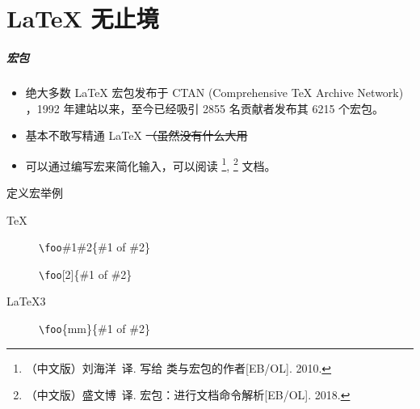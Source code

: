 
\part{\LaTeX{} 无止境}

\begin{frame}
  \frametitle{宏包}

  \begin{itemize}
    \item 绝大多数 \LaTeX{} 宏包发布于 CTAN (Comprehensive \TeX{} Archive Network) ，1992 年建站以来，至今已经吸引 2855 名贡献者发布其 6215 个宏包。 
    \item {}基本不敢写精通 \LaTeX{} \sout{（虽然没有什么大用}
    \item 可以通过编写宏来简化输入，可以阅读 \footnote{（中文版）刘海洋~译. 写给 \LaTeXe{} 类与宏包的作者[EB/OL]. 2010. }, 
    \footnote{（中文版）盛文博~译.  宏包：进行文档命令解析[EB/OL]. 2018. } 文档。
  \end{itemize}

  \begin{exampleblock}{定义宏举例}
    \begin{description}
      \item[\TeX] \texttt{\textbackslash{}foo}\#1\#2\{\#1 of \#2\}
      \item[\LaTeXe] \texttt{\textbackslash{}foo}[2]\{\#1 of \#2\}
      \item[\LaTeX3] \texttt{\textbackslash{}foo}\{mm\}\{\#1 of \#2\}
    \end{description}
  \end{exampleblock}

  
\end{frame}


